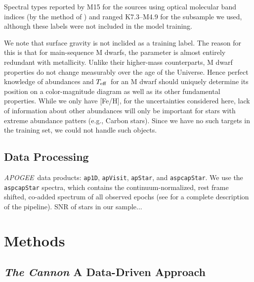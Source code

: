 \documentclass[modern]{aastex62}
\newcommand{\apogee}{\textsl{APOGEE}}
\newcommand{\thecannon}{\textsl{The Cannon}}
\newcommand{\teff}{$T_{\rm eff}$}
\begin{document}
Spectral types reported by M15 for the sources using optical molecular band indices (by the method of \citealt{Lepine:2013}) and ranged K7.3--M4.9 for the subsample we used, although these labels were not included in the model training.

We note that surface gravity is not inclided as a training label. The reason for this is that for main-sequence M dwarfs, the parameter is almost entirely redundant with metallicity. Unlike their higher-mass counterparts, M dwarf properties do not change measurably over the age of the Universe. Hence perfect knowledge of abundances and \teff\ for an M dwarf should uniquely determine its position on a color-magnitude diagram as well as its other fundamental properties. While we only have [Fe/H], for the uncertainties considered here, lack of information about other abundances will only be important for stars with extreme abundance patters (e.g., Carbon stars). Since we have no such targets in the training set, we could not handle such objects. 


\subsection{Data Processing}

\apogee\ data products: {\tt\string ap1D}, {\tt\string apVisit}, {\tt\string apStar}, and {\tt\string aspcapStar}. We use the {\tt\string aspcapStar} spectra, which contains the continuum-normalized, rest frame shifted, co-added spectrum of all observed epochs (see \citealt{Perez:2016} for a complete description of the pipeline). SNR of stars in our sample...


\section{Methods} \label{sec:cannon}

\subsection{\thecannon\: A Data-Driven Approach}
\end{document}
